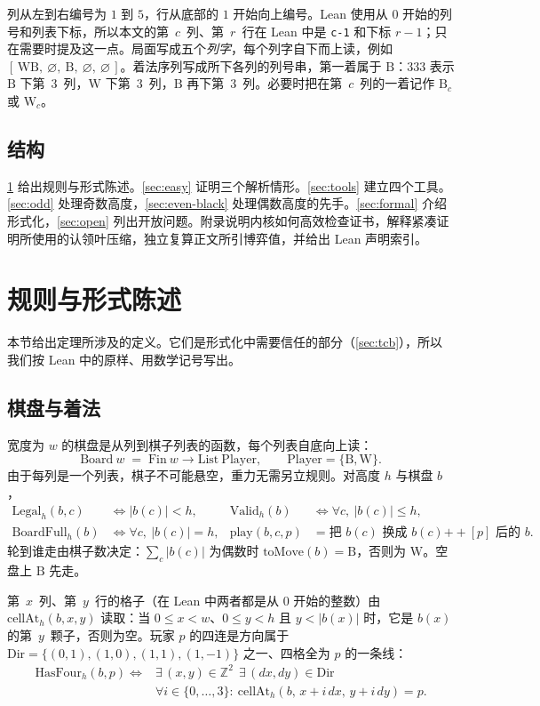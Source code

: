 \documentclass[11pt,a4paper]{article}
\theoremstyle{zhthm}
\newcommand{\code}[1]{{\upshape\texttt{\small\nolinkurl{#1}}}}
\newcommand{\B}{\mathrm{B}}
\newcommand{\W}{\mathrm{W}}
\newcommand{\col}[1]{[#1]}
\newcommand{\HasFour}{\mathrm{HasFour}}
\begin{document}
列从左到右编号为 $1$ 到 $5$，行从底部的 $1$ 开始向上编号。Lean 使用从 $0$ 开始的列号和列表下标，所以本文的第~$c$~列、第~$r$~行在 Lean 中是 \code{c-1} 和下标 $r-1$；只在需要时提及这一点。局面写成五个\emph{列字}，每个列字自下而上读，例如 $\col{\,\W\B,\ \varnothing,\ \B,\ \varnothing,\ \varnothing\,}$。着法序列写成所下各列的列号串，第一着属于 $\B$：$333$ 表示 $\B$ 下第~$3$~列，$\W$ 下第~$3$~列，$\B$ 再下第~$3$~列。必要时把在第~$c$~列的一着记作 $\B_c$ 或 $\W_c$。

\subsection{结构}

\cref{sec:rules} 给出规则与形式陈述。\cref{sec:easy} 证明三个解析情形。\cref{sec:tools} 建立四个工具。\cref{sec:odd} 处理奇数高度，\cref{sec:even-black} 处理偶数高度的先手。\cref{sec:formal} 介绍形式化，\cref{sec:open} 列出开放问题。附录说明内核如何高效检查证书，解释紧凑证明所使用的认领叶压缩，独立复算正文所引博弈值，并给出 Lean 声明索引。

\section{规则与形式陈述}
\label{sec:rules}

本节给出定理所涉及的定义。它们是形式化中需要信任的部分（\cref{sec:tcb}），所以我们按 Lean 中的原样、用数学记号写出。

\subsection{棋盘与着法}

宽度为 $w$ 的棋盘是从列到棋子列表的函数，每个列表自底向上读：
\[
  \mathrm{Board}\ w \;=\; \mathrm{Fin}\ w \to \mathrm{List}\ \mathrm{Player},\qquad \mathrm{Player}=\{\B,\W\}.
\]
由于每列是一个列表，棋子不可能悬空，重力无需另立规则。对高度 $h$ 与棋盘 $b$，
\begin{align*}
  \mathrm{Legal}_h(b,c) &\iff |b(c)| < h, &
  \mathrm{Valid}_h(b) &\iff \forall c,\ |b(c)|\le h,\\
  \mathrm{BoardFull}_h(b) &\iff \forall c,\ |b(c)| = h, &
  \mathrm{play}(b,c,p) &= \text{把 } b(c) \text{ 换成 } b(c)\mathbin{+\!\!+}[p] \text{ 后的 } b.
\end{align*}
轮到谁走由棋子数决定：$\sum_c |b(c)|$ 为偶数时 $\mathrm{toMove}(b)=\B$，否则为 $\W$。空盘上 $\B$ 先走。

第~$x$~列、第~$y$~行的格子（在 Lean 中两者都是从 $0$ 开始的整数）由 $\mathrm{cellAt}_h(b,x,y)$ 读取：当 $0\le x<w$、$0\le y<h$ 且 $y<|b(x)|$ 时，它是 $b(x)$ 的第~$y$~颗子，否则为空。玩家 $p$ 的四连是方向属于 $\mathrm{Dir}=\{(0,1),(1,0),(1,1),(1,-1)\}$ 之一、四格全为 $p$ 的一条线：
\begin{align*}
  \HasFour_h(b,p) \iff{}& \exists\, (x,y)\in\mathbb Z^2\ \ \exists\,(dx,dy)\in\mathrm{Dir}\\
  & \forall i\in\{0,\dots,3\}:\ \mathrm{cellAt}_h(b,\,x+i\,dx,\,y+i\,dy)=p.
\end{align*}
\end{document}
